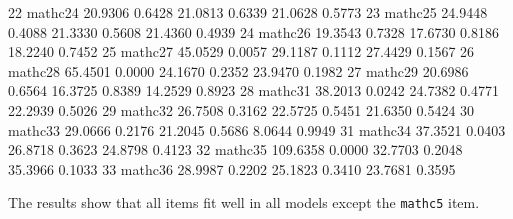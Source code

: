 \documentclass[
]{article}
\newenvironment{Shaded}{\begin{snugshade}}{\end{snugshade}}
\newcommand{\DecValTok}[1]{\textcolor[rgb]{0.00,0.00,0.81}{#1}}
\newcommand{\FloatTok}[1]{\textcolor[rgb]{0.00,0.00,0.81}{#1}}
\newcommand{\NormalTok}[1]{#1}
\begin{document}
\begin{Shaded}
\begin{Highlighting}[]
\DecValTok{22}\NormalTok{ mathc24  }\FloatTok{20.9306} \FloatTok{0.6428} \FloatTok{21.0813} \FloatTok{0.6339} \FloatTok{21.0628} \FloatTok{0.5773}
\DecValTok{23}\NormalTok{ mathc25  }\FloatTok{24.9448} \FloatTok{0.4088} \FloatTok{21.3330} \FloatTok{0.5608} \FloatTok{21.4360} \FloatTok{0.4939}
\DecValTok{24}\NormalTok{ mathc26  }\FloatTok{19.3543} \FloatTok{0.7328} \FloatTok{17.6730} \FloatTok{0.8186} \FloatTok{18.2240} \FloatTok{0.7452}
\DecValTok{25}\NormalTok{ mathc27  }\FloatTok{45.0529} \FloatTok{0.0057} \FloatTok{29.1187} \FloatTok{0.1112} \FloatTok{27.4429} \FloatTok{0.1567}
\DecValTok{26}\NormalTok{ mathc28  }\FloatTok{65.4501} \FloatTok{0.0000} \FloatTok{24.1670} \FloatTok{0.2352} \FloatTok{23.9470} \FloatTok{0.1982}
\DecValTok{27}\NormalTok{ mathc29  }\FloatTok{20.6986} \FloatTok{0.6564} \FloatTok{16.3725} \FloatTok{0.8389} \FloatTok{14.2529} \FloatTok{0.8923}
\DecValTok{28}\NormalTok{ mathc31  }\FloatTok{38.2013} \FloatTok{0.0242} \FloatTok{24.7382} \FloatTok{0.4771} \FloatTok{22.2939} \FloatTok{0.5026}
\DecValTok{29}\NormalTok{ mathc32  }\FloatTok{26.7508} \FloatTok{0.3162} \FloatTok{22.5725} \FloatTok{0.5451} \FloatTok{21.6350} \FloatTok{0.5424}
\DecValTok{30}\NormalTok{ mathc33  }\FloatTok{29.0666} \FloatTok{0.2176} \FloatTok{21.2045} \FloatTok{0.5686}  \FloatTok{8.0644} \FloatTok{0.9949}
\DecValTok{31}\NormalTok{ mathc34  }\FloatTok{37.3521} \FloatTok{0.0403} \FloatTok{26.8718} \FloatTok{0.3623} \FloatTok{24.8798} \FloatTok{0.4123}
\DecValTok{32}\NormalTok{ mathc35 }\FloatTok{109.6358} \FloatTok{0.0000} \FloatTok{32.7703} \FloatTok{0.2048} \FloatTok{35.3966} \FloatTok{0.1033}
\DecValTok{33}\NormalTok{ mathc36  }\FloatTok{28.9987} \FloatTok{0.2202} \FloatTok{25.1823} \FloatTok{0.3410} \FloatTok{23.7681} \FloatTok{0.3595}
\end{Highlighting}
\end{Shaded}

The results show that all items fit well in all models except the
\texttt{mathc5} item.
\end{document}
